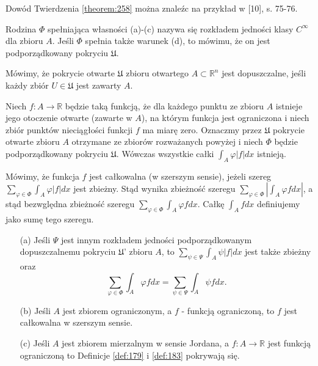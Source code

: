 \documentclass[leqno]{article}
\begin{document}
\begin{justify}
Dowód Twierdzenia \ref{theorem:258} można znaleźc na przykład w [10], s. 75-76.

\begin{defn}
    Rodzina $\Phi$ spełniająca własności (a)-(c) nazywa się rozkładem jedności klasy $C^\infty$ dla zbioru $A$.
    Jeśli $\Phi$ spełnia także warunek (d), to mówimu, że on jest podporządkowany pokryciu $\mathfrak{U}$.
\end{defn}

\begin{defn}
    Mówimy, że pokrycie otwarte $\mathfrak{U}$ zbioru otwartego $A \subset \mathbb{R}^n$ jest dopuszczalne, jeśli każdy zbiór $U \in \mathfrak{U}$ jest zawarty $A$.
\end{defn}

\begin{defn}
    Niech $ f : A \to \mathbb{R}$ będzie taką funkcją, że dla każdego punktu ze zbioru $A$ istnieje jego otoczenie otwarte (zawarte w $A$), na którym funkcja jest ograniczona 
    i niech zbiór punktów nieciągłości funkcji $f$ ma miarę zero. Oznaczmy przez $\mathfrak{U}$ pokrycie otwarte zbioru $A$ otrzymane ze zbiorów rozważanych powyżej i niech $\Phi$ będzie 
    podporządkowany pokryciu $\mathfrak{U}$. Wówczas wszystkie całki $\int_A \varphi |f| dx$ istnieją.
\end{defn}

Mówimy, że funkcja $f$ jest całkowalna (w szerszym sensie), jeżeli szereg $\sum_{\varphi \in \Phi}\int_{A}\varphi |f| dx$ jest zbieżny.
Stąd wynika zbieżność szeregu $\sum_{\varphi \in \Phi}|\int_A \varphi f dx|$, a stąd bezwględna zbieżność szeregu $\sum_{\varphi \in \Phi}\int_A \varphi f dx$.
Całkę $\int_A f dx$ definiujemy jako sumę tego szeregu.

\begin{theorem}
{
    \begin{itemize}
        \item [(a)] Jeśli $\Psi$ jest innym rozkładem jedności podporządkowanym dopuszczalnemu pokryciu $\mathfrak{U}$' zbioru $A$, to 
            $\sum_{\psi \in \Psi}\int_A \psi |f|dx$ jest także zbieżny oraz 
            \[
                \sum_{\varphi \in \Phi}\int_A \varphi f dx = \sum_{\psi \in \Psi}\int_A \psi f dx.
            \]
        \item [(b)] Jeśli $A$ jest zbiorem ograniczonym, a $f$ - funkcją ograniczoną, to $f$ jest całkowalna w szerszym sensie. 
        \item [(c)] Jeśli $A$ jest zbiorem mierzalnym w sensie Jordana, a $f : A \to \mathbb{R}$ jest funkcją ograniczoną to Definicje \ref{def:179} i \ref{def:183} pokrywają się.
    \end{itemize}
}
\end{theorem}


\end{justify}
\end{document}
